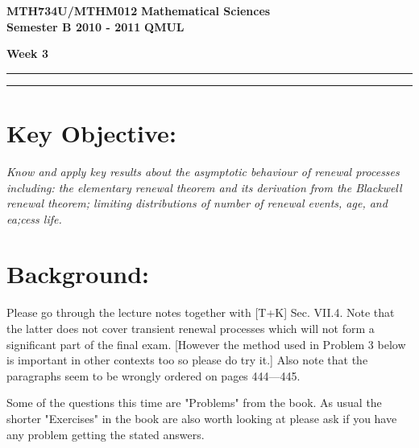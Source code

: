 \documentclass[11pt,a4paper]{article}
\begin{document}
  \textbf{MTH734U/MTHM012} \hfill \textbf{Mathematical Sciences}\\
  \textbf{Semester B 2010 - 2011} \hfill \textbf{QMUL}
  \begin{center}
    \textbf{\huge Week 3}
  \end{center}
  \hrule \vspace{2mm} \hrule
  \section*{Key Objective:}
  \textit{Know and apply key results about the asymptotic behaviour of renewal processes including: the elementary renewal theorem and its derivation from the Blackwell renewal theorem; limiting distributions of number of renewal events, age, and ea;cess life.}
  \section*{Background:}
  Please go through the lecture notes together with [T+K] Sec. VII.4. Note that the latter does not cover transient renewal processes which will not form a significant part of the final exam. [However the method used in Problem 3 below is important in other contexts too so please do try it.] Also note that the paragraphs seem to be wrongly ordered on pages 444—445.\par
  Some of the questions this time are "Problems" from the book. As usual the shorter "Exercises" in the book are also worth looking at please ask if you have any problem getting the stated answers.
  \newpage
\end{document}
